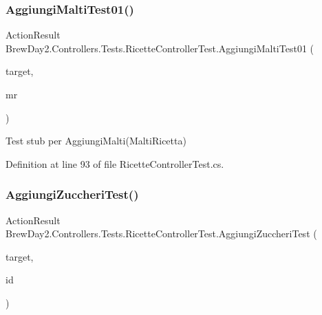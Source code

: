 \subsubsection{\texorpdfstring{Aggiungi\+Malti\+Test01()}{AggiungiMaltiTest01()}}
{\footnotesize\ttfamily Action\+Result Brew\+Day2.\+Controllers.\+Tests.\+Ricette\+Controller\+Test.\+Aggiungi\+Malti\+Test01 (\begin{DoxyParamCaption}\item[{\mbox{[}\+Pex\+Assume\+Under\+Test\mbox{]} \mbox{\hyperlink{class_brew_day2_1_1_controllers_1_1_ricette_controller}{Ricette\+Controller}}}]{target,  }\item[{\mbox{\hyperlink{class_brew_day2_1_1_models_1_1_malti_ricetta}{Malti\+Ricetta}}}]{mr }\end{DoxyParamCaption})}



Test stub per Aggiungi\+Malti(\+Malti\+Ricetta)



Definition at line 93 of file Ricette\+Controller\+Test.\+cs.

\mbox{\label{class_brew_day2_1_1_controllers_1_1_tests_1_1_ricette_controller_test_a01af8b679bfad22dc9c7fc5d6f9f2aca}} 
\subsubsection{\texorpdfstring{Aggiungi\+Zuccheri\+Test()}{AggiungiZuccheriTest()}}
{\footnotesize\ttfamily Action\+Result Brew\+Day2.\+Controllers.\+Tests.\+Ricette\+Controller\+Test.\+Aggiungi\+Zuccheri\+Test (\begin{DoxyParamCaption}\item[{\mbox{[}\+Pex\+Assume\+Under\+Test\mbox{]} \mbox{\hyperlink{class_brew_day2_1_1_controllers_1_1_ricette_controller}{Ricette\+Controller}}}]{target,  }\item[{int}]{id }\end{DoxyParamCaption})}



